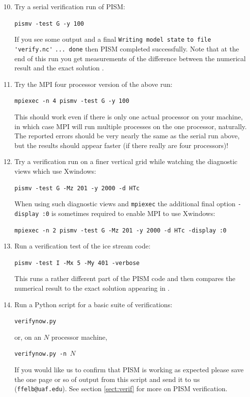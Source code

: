 \documentclass[11pt,final]{amsart}
\begin{document}
\begin{enumerate}\setcounter{enumi}{9}
\item \label{serialpismvrun} Try a serial verification run of PISM:

\verb|pismv -test G -y 100|

\noindent If you see some output and a final \verb|Writing model state| \verb|to file 'verify.nc'| \verb|... done| then PISM completed successfully.  Note that at the end of this run you get measurements of the difference between the numerical result and the exact solution \cite{BBL}.

\item Try the MPI four processor version of the above run:

\verb|mpiexec -n 4 pismv -test G -y 100|

\noindent This should work even if there is only one actual processor on your machine, in which case MPI will run multiple processes on the one processor, naturally.  The reported errors should be very nearly the same as the serial run above, but the results should appear faster (if there really are four processors)!

\item Try a verification run on a finer vertical grid while watching the diagnostic views which use Xwindows:

\verb|pismv -test G -Mz 201 -y 2000 -d HTc|

\noindent When using such diagnostic views and \verb|mpiexec| the additional final option \verb|-display :0| is sometimes required to enable MPI to use Xwindows:

\verb|mpiexec -n 2 pismv -test G -Mz 201 -y 2000 -d HTc -display :0|

\item Run a verification test of the ice stream code:

\verb|pismv -test I -Mx 5 -My 401 -verbose|

\noindent This runs a rather different part of the PISM code and then compares the numerical result to the exact solution appearing in \cite{SchoofStream}.

\item Run a Python script for a basic suite of verifications:

\verb|verifynow.py|

\noindent or, on an $N$ processor machine,

\verb|verifynow.py -n |$N$

\noindent If you would like us to confirm that PISM is working as expected please save the one page or so of output from this script and send it to us (\verb|ffelb@uaf.edu|).  See section \ref{sect:verif} for more on PISM verification.
\end{enumerate}
\smallskip
\end{document}
